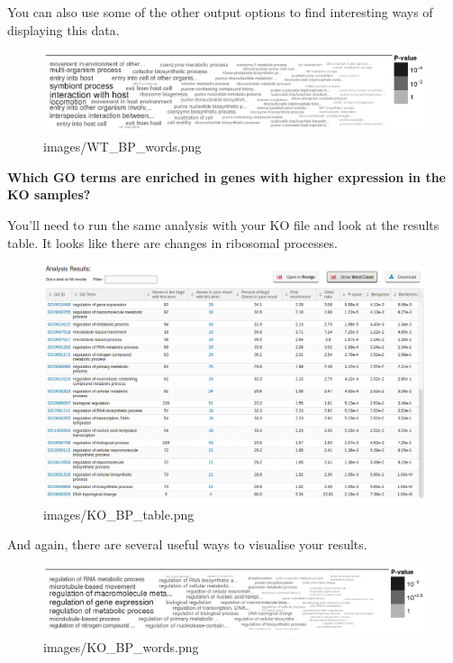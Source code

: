 \documentclass[11pt]{article}
\makeatletter
\def\maxwidth{\ifdim\Gin@nat@width>\linewidth\linewidth
    \else\Gin@nat@width\fi}
\let\Oldincludegraphics\includegraphics
\renewcommand{\includegraphics}[1]{\Oldincludegraphics[width=.8\maxwidth, height=.55\textheight, keepaspectratio]{#1}}
\makeatother
\begin{document}
    You can also use some of the other output options to find interesting
ways of displaying this data.

    \begin{figure}[!h]
\centering
\includegraphics{images/WT_BP_words.png}
\caption{images/WT\_BP\_words.png}
\end{figure}

\newpage

    \textbf{Which GO terms are enriched in genes with
higher expression in the KO samples?}

    You'll need to run the same analysis with your KO file and look at the
results table. It looks like there are changes in ribosomal processes.

    \begin{figure}[!h]
\centering
\includegraphics{images/KO_BP_table.png}
\caption{images/KO\_BP\_table.png}
\end{figure}

    And again, there are several useful ways to visualise your results.

    \begin{figure}[!h]
\centering
\includegraphics{images/KO_BP_words.png}
\caption{images/KO\_BP\_words.png}
\end{figure}
\end{document}
